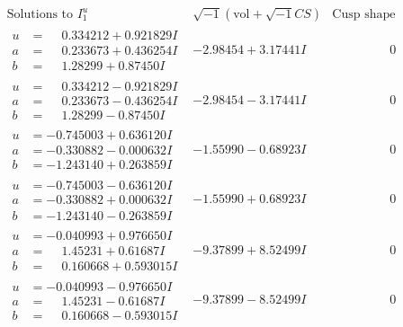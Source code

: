 \documentclass[1p]{elsarticle_modified}
\theoremstyle{definition}
\newcommand{\I}{\sqrt{-1}}
\begin{document}
$$\begin{array}{c|c|c}  
\text{Solutions to }I^u_{1}& \I (\text{vol} + \sqrt{-1}CS) & \text{Cusp shape}\\
 \hline 
\begin{aligned}
u &= \phantom{-}0.334212 + 0.921829 I \\
a &= \phantom{-}0.233673 + 0.436254 I \\
b &= \phantom{-}1.28299 + 0.87450 I\end{aligned}
 & -2.98454 + 3.17441 I & \phantom{-0.000000 } 0 \\ \hline\begin{aligned}
u &= \phantom{-}0.334212 - 0.921829 I \\
a &= \phantom{-}0.233673 - 0.436254 I \\
b &= \phantom{-}1.28299 - 0.87450 I\end{aligned}
 & -2.98454 - 3.17441 I & \phantom{-0.000000 } 0 \\ \hline\begin{aligned}
u &= -0.745003 + 0.636120 I \\
a &= -0.330882 - 0.000632 I \\
b &= -1.243140 + 0.263859 I\end{aligned}
 & -1.55990 - 0.68923 I & \phantom{-0.000000 } 0 \\ \hline\begin{aligned}
u &= -0.745003 - 0.636120 I \\
a &= -0.330882 + 0.000632 I \\
b &= -1.243140 - 0.263859 I\end{aligned}
 & -1.55990 + 0.68923 I & \phantom{-0.000000 } 0 \\ \hline\begin{aligned}
u &= -0.040993 + 0.976650 I \\
a &= \phantom{-}1.45231 + 0.61687 I \\
b &= \phantom{-}0.160668 + 0.593015 I\end{aligned}
 & -9.37899 + 8.52499 I & \phantom{-0.000000 } 0 \\ \hline\begin{aligned}
u &= -0.040993 - 0.976650 I \\
a &= \phantom{-}1.45231 - 0.61687 I \\
b &= \phantom{-}0.160668 - 0.593015 I\end{aligned}
 & -9.37899 - 8.52499 I & \phantom{-0.000000 } 0 \\ \hline\begin{aligned}

\end{aligned}
\end{array}$$
\end{document}
